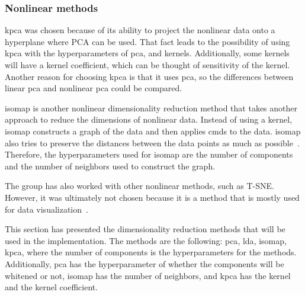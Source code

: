\subsubsection{Nonlinear methods}
\gls{kpca} was chosen because of its ability to project the nonlinear data onto a hyperplane where PCA can be used. That fact leads to the possibility of using \gls{kpca} with the hyperparameters of \gls{pca}, and kernels. Additionally, some kernels will have a kernel coefficient, which can be thought of sensitivity of the kernel. Another reason for choosing \gls{kpca} is that it uses \gls{pca}, so the differences between linear \gls{pca} and nonlinear \gls{pca} could be compared.

\gls{isomap} is another nonlinear dimensionality reduction method that takes another approach to reduce the dimensions of nonlinear data. Instead of using a kernel, \gls{isomap} constructs a graph of the data and then applies \gls{cmds} to the data. \gls{isomap} also tries to preserve the distances between the data points as much as possible~\cite{dimensionality-reduction-comparative-review}. Therefore, the hyperparameters used for \gls{isomap} are the number of components and the number of neighbors used to construct the graph.

The group has also worked with other nonlinear methods, such as T-SNE. However, it was ultimately not chosen because it is a method that is mostly used for data visualization~\cite{tsne-visualization}.


This section has presented the dimensionality reduction methods that will be used in the implementation. The methods are the following: \gls{pca}, \gls{lda}, \gls{isomap}, \gls{kpca}, where the number of components is the hyperparameters for the methods. Additionally, \gls{pca} has the hyperparameter of whether the components will be whitened or not, \gls{isomap} has the number of neighbors, and \gls{kpca} has the kernel and the kernel coefficient.

